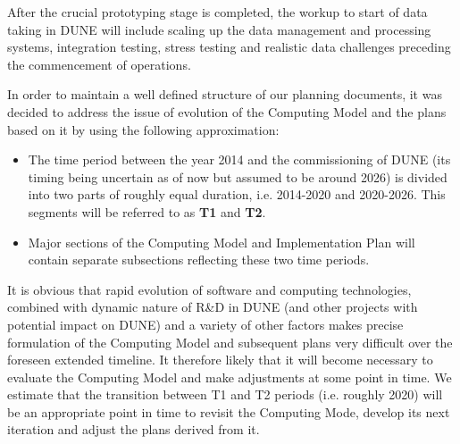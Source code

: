 After the crucial prototyping stage is completed, the workup to start of data taking in DUNE will include scaling up the data management and processing systems,
integration testing,  stress testing and  realistic data challenges preceding the commencement of operations.

In order to maintain a well defined structure of our planning documents, it was decided to address the issue of evolution of the Computing Model 
and the plans based on it by using the following approximation:

\begin{itemize}

\item The time period between the year 2014 and the commissioning of DUNE (its timing being uncertain as of now but assumed to be around 2026) is divided into two parts of roughly equal duration, i.e. 2014-2020 and 2020-2026. This segments will be referred to as \textbf{T1} and \textbf{T2}.


\item Major sections of the Computing Model and Implementation Plan will contain separate subsections reflecting these two time periods.

\end{itemize}
 
It is obvious that rapid evolution of software and computing technologies, combined with dynamic nature of R\&D in DUNE (and other  projects with potential impact on DUNE) and a variety of other factors makes precise formulation of the Computing Model and subsequent plans very difficult over the foreseen extended timeline. It  therefore likely that it will become necessary to evaluate the Computing Model and make adjustments at some point in time. We estimate that the transition between T1 and T2 periods (i.e. roughly 2020) will be an appropriate point in time to revisit the Computing Mode, develop its next
iteration and adjust the plans derived from it.

